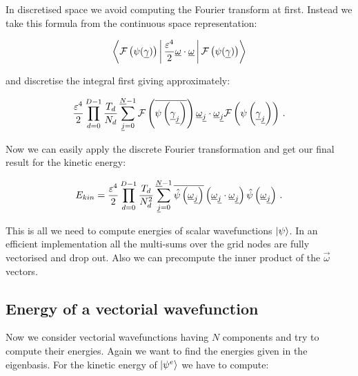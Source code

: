 In discretised space we avoid computing the Fourier transform at first. Instead
we take this formula from the continuous space representation:

\begin{equation*}
  \Braket{\mathcal{F}\left(\psi(\underline{\gamma})\right) | \frac{\varepsilon^4}{2} \underline{\omega} \cdot \underline{\omega} | \mathcal{F}\left(\psi(\underline{\gamma})\right)}
\end{equation*}

and discretise the integral first giving approximately:

\begin{equation*}
  \frac{\varepsilon^4}{2} \prod_{d=0}^{D-1} \frac{T_d}{N_d}
                          \sum_{\underline{j}=0}^{\underline{N}-1}
                            \mathcal{F}\left(\overline{\psi\left(\underline{\gamma}_{\underline{j}}\right)}\right)
                            \underline{\omega}_{\underline{j}} \cdot \underline{\omega}_{\underline{j}}
                            \mathcal{F}\left(\psi\left(\underline{\gamma}_{\underline{j}}\right)\right) \,.
\end{equation*}

Now we can easily apply the discrete Fourier transformation and get our
final result for the kinetic energy:

\begin{equation} \label{eq:ekin_wf_scalar}
  E_{kin} =   \frac{\varepsilon^4}{2} \prod_{d=0}^{D-1} \frac{T_d}{N_d^2}
                          \sum_{\underline{j}=0}^{\underline{N}-1}
                            \overline{\hat{\psi}\left(\underline{\omega}_{\underline{j}}\right)}
                            \left(\underline{\omega}_{\underline{j}} \cdot \underline{\omega}_{\underline{j}}\right)
                            \hat{\psi}\left(\underline{\omega}_{\underline{j}}\right) \,.
\end{equation}

This is all we need to compute energies of scalar wavefunctions $\Ket{\psi}$.
In an efficient implementation all the multi-sums over the grid nodes are fully
vectorised and drop out. Also we can precompute the inner product of the
$\vec{\omega}$ vectors.



\subsection{Energy of a vectorial wavefunction}


Now we consider vectorial wavefunctions having $N$ components and try to
compute their energies. Again we want to find the energies given in the
eigenbasis. For the kinetic energy of $\Ket{\psi^{e}}$ we have to compute:

